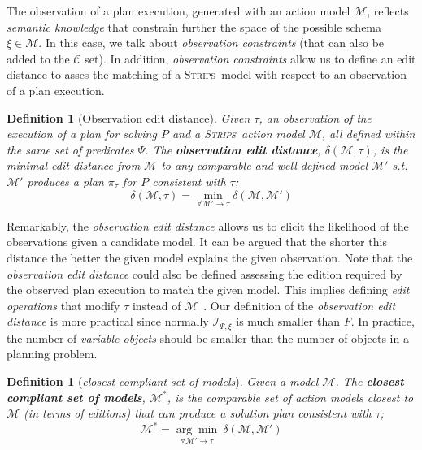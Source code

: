 \documentclass[letterpaper]{article} %
\newcommand{\strips}{\textsc{Strips}}     %
\newtheorem{definition}[theorem]{Definition}
\begin{document}
The observation of a plan execution, generated with an action model $\mathcal{M}$, reflects {\em semantic knowledge} that constrain further the space of the possible schema $\xi\in \mathcal{M}$. In this case, we talk about {\em observation constraints} (that can also be added to the $\mathcal{C}$ set). In addition, {\em observation constraints} allow us to define an edit distance to asses the matching of a \strips\ model with respect to an observation of a plan execution. 

\begin{definition}[Observation edit distance]
  Given $\tau$, an observation of the execution of a plan for solving $P$ and a \strips\ action model $\mathcal{M}$, all defined within the same set of predicates $\Psi$. The {\bf observation edit distance}, $\delta(\mathcal{M},\tau)$, is the minimal edit distance from $\mathcal{M}$ to any {\em comparable} and well-defined model $\mathcal{M}'$ s.t. $\mathcal{M}'$ produces a plan $\pi_\tau$ for $P$ {\em consistent} with $\tau$; \[\delta(\mathcal{M},\tau)=\min_{\forall \mathcal{M}' \rightarrow \tau} \delta(\mathcal{M},\mathcal{M}')\]
\end{definition}

Remarkably, the {\em observation edit distance} allows us to elicit the likelihood of the observations given a candidate model. It can be argued that the shorter this  distance the better the given model explains the given observation. Note that the {\em observation edit distance} could also be defined assessing the edition required by the observed plan execution to match the given model. This implies defining {\em edit operations} that modify $\tau$ instead of $\mathcal{M}$~\cite{sohrabi:precognition:IJCAI2016}. Our definition of the {\em observation edit distance} is more practical since normally ${\mathcal I}_{\Psi,\xi}$ is much smaller than $F$. In practice, the number of {\em variable objects} should be smaller than the number of objects in a planning problem.

\begin{definition}[{\em closest compliant set of models}] \label{compliant}
Given a model $\mathcal{M}$. The {\bf closest compliant set of models}, $\mathcal{M^*}$, is the comparable set of action models closest to $\mathcal{M}$ (in terms of editions) that can produce a solution plan consistent with $\tau$;
  \[\mathcal{M^*}=\underset{\forall \mathcal{M}' \rightarrow \tau}{\arg\min}\ \delta(\mathcal{M},\mathcal{M}') \]
\end{definition}
\end{document}
